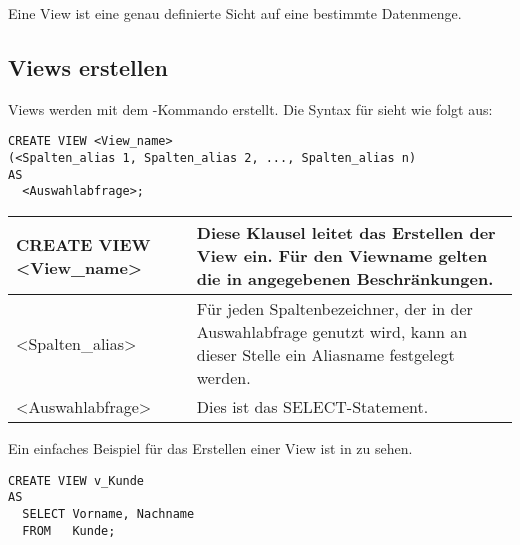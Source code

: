         \begin{merke}
          Eine View ist eine genau definierte Sicht auf eine bestimmte Datenmenge.
        \end{merke}
      \subsection{Views erstellen}
        Views werden mit dem -Kommando erstellt. Die Syntax für  sieht wie folgt aus:
        \begin{lstlisting}[language=oracle_sql,caption={Die Syntax von CREATE VIEW},label=sql08_24]
CREATE VIEW <View_name>
(<Spalten_alias 1, Spalten_alias 2, ..., Spalten_alias n)
AS
  <Auswahlabfrage>;
        \end{lstlisting}
        \begin{center}
          \label{createviewsyntax}
          \begin{small}
            \tabletail{
              \hline
            }
            \tablelasttail{
              \hline
            }
            \begin{supertabular}{|l|p{9.45cm}|}
              CREATE VIEW <View\_name> & Diese Klausel leitet das Erstellen der View ein. Für den Viewname gelten die in  angegebenen Beschränkungen. \\
              \hline
              <Spalten\_alias> & Für jeden Spaltenbezeichner, der in der Auswahlabfrage genutzt wird, kann an dieser Stelle ein Aliasname festgelegt werden.\\
              \hline
              <Auswahlabfrage> & Dies ist das SELECT-Statement. \\
            \end{supertabular}
          \end{small}
        \end{center}
        Ein einfaches Beispiel für das Erstellen einer View ist in  zu sehen.
        \begin{lstlisting}[language=oracle_sql,caption={Eine einfache View},label=sql08_25]
CREATE VIEW v_Kunde
AS
  SELECT Vorname, Nachname
  FROM   Kunde;
        \end{lstlisting}
